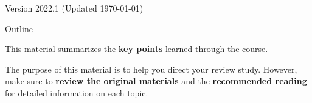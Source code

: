 \documentclass[aspectratio=169]{beamer}
\subtitle[Course Review]{Review 02 - Course Review}
\date{}
\begin{document}
\begin{CJK}{UTF8}{ipxm}

\begin{frame}
  \maketitle

  \vfill

  \hfill \tiny{Version 2022.1 (Updated \today)}
\end{frame}

\begin{frame}[t]{Outline}

  This material summarizes the {\bf key points}
  learned through the course.\bigskip

  The purpose of this material is to help you direct your review study. However, make sure to {\bf review the original materials} and the {\bf recommended reading} for detailed information on each topic.

\end{frame}











\end{CJK}
\end{document}
